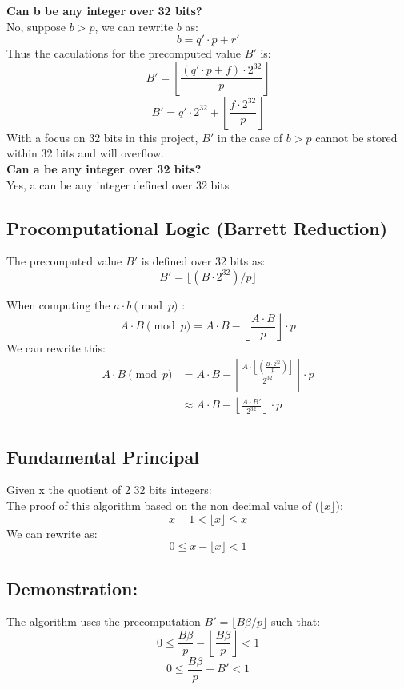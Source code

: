\documentclass{article}
\begin{document}
\textbf{Can b be any integer over 32 bits?} \\
No, suppose $ b > p $, we can rewrite $b$ as:
\[b = q'\cdot p + r'\]
Thus the caculations for the precomputed value $B'$ is:
\[B' = \left\lfloor\frac{(q' \cdot p + f)\cdot 2^{32}}{p}\right\rfloor\]
\[B' = q' \cdot 2^{32} + \left\lfloor\frac{ f\cdot 2^{32}}{p}\right\rfloor\]
With a focus on 32 bits in this project, $B'$ in the case of $b>p$ cannot be stored within 32 bits and will overflow.\\
\textbf{Can a be any integer over 32 bits?} \\
Yes, a can be any integer defined over 32 bits
\subsection{Procomputational Logic (Barrett Reduction)}
The precomputed value $B'$ is defined over 32 bits as:
\[B'= \lfloor (B \cdot 2^{32}) / p \rfloor \]

When computing the $a \cdot b \pmod{p}$ :
\begin{equation*}
    A \cdot B \pmod{p} = A \cdot B -  \left\lfloor \frac{A \cdot B}{p} \right\rfloor \cdot p
\end{equation*}
We can rewrite this:
\begin{align*}
    A \cdot B \pmod{p} & = A \cdot B -  \left\lfloor \frac{A \cdot \left\lfloor (\frac{B \cdot 2^{32}}{p}) \right\rfloor}{2^{32}} \right\rfloor \cdot p \\
                       & \approx A \cdot B -  \left\lfloor \frac{A \cdot B'}{2^{32}} \right\rfloor \cdot p                                              \\
\end{align*}



\subsection{Fundamental Principal}
Given x the quotient of 2 32 bits integers: \\
The proof of this algorithm based on the non decimal value of ($\lfloor x \rfloor$):
$$x - 1 < \lfloor x \rfloor \le x$$
We can rewrite as:
$$0 \le x - \lfloor x \rfloor < 1$$


\subsection{Demonstration:}
The algorithm uses the precomputation $B' = \lfloor B\beta/p \rfloor$ such that:
\[0 \le \frac{B\beta}{p} - \left\lfloor \frac{B\beta}{p} \right\rfloor < 1 \]
\begin{equation}
    0 \le \frac{B\beta}{p} - B' < 1
\end{equation}
\end{document}

